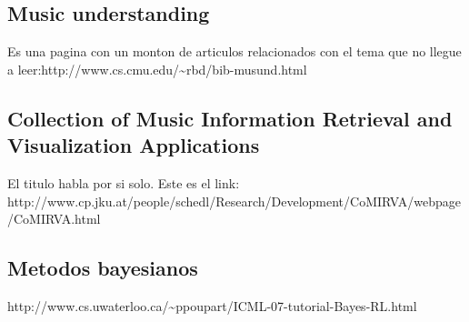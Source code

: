 \documentclass[a4paper,10pt]{article}
\begin{document}
\subsection{Music understanding}
Es una pagina con un monton de articulos relacionados con el tema que no llegue a leer:http://www.cs.cmu.edu/\~{}rbd/bib-musund.html

\subsection{Collection of Music Information Retrieval and Visualization Applications}
El titulo habla por si solo. Este es el link: \newline http://www.cp.jku.at/people/schedl/Research/Development/CoMIRVA/webpage/CoMIRVA.html

\subsection{Metodos bayesianos}
http://www.cs.uwaterloo.ca/\~{}ppoupart/ICML-07-tutorial-Bayes-RL.html
\end{document}

